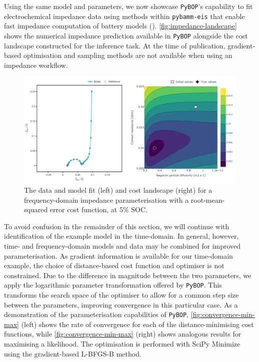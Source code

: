 \documentclass[
]{article}
\begin{document}
Using the same model and parameters, we now showcase \texttt{PyBOP}'s
capability to fit electrochemical impedance data using methods within
\texttt{pybamm-eis} that enable fast impedance computation of battery
models ().
\autoref{fig:impedance-landscape} shows the numerical impedance
prediction available in \texttt{PyBOP} alongside the cost landscape
constructed for the inference task. At the time of publication,
gradient-based optimisation and sampling methods are not available when
using an impedance workflow.

\begin{figure}
\centering
\includegraphics[width=1\textwidth,height=\textheight]{figures/joss/impedance.pdf}
\caption{The data and model fit (left) and cost landscape (right) for a
frequency-domain impedance parameterisation with a root-mean-squared
error cost function, at 5\% SOC. \label{fig:impedance-landscape}}
\end{figure}

To avoid confusion in the remainder of this section, we will continue
with identification of the example model in the time-domain. In general,
however, time- and frequency-domain models and data may be combined for
improved parameterisation. As gradient information is available for our
time-domain example, the choice of distance-based cost function and
optimiser is not constrained. Due to the difference in magnitude between
the two parameters, we apply the logarithmic parameter transformation
offered by \texttt{PyBOP}. This transforms the search space of the
optimiser to allow for a common step size between the parameters,
improving convergence in this particular case. As a demonstration of the
parameterisation capabilities of \texttt{PyBOP},
\autoref{fig:convergence-min-max} (left) shows the rate of convergence
for each of the distance-minimising cost functions, while
\autoref{fig:convergence-min-max} (right) shows analogous results for
maximising a likelihood. The optimisation is performed with SciPy
Minimize using the gradient-based L-BFGS-B method.
\end{document}

